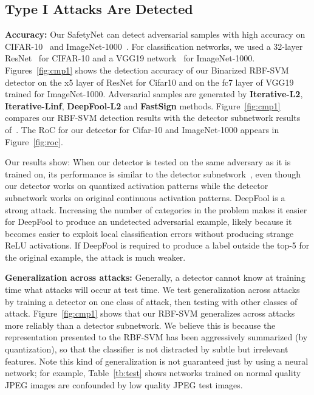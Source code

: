 \documentclass[10pt,twocolumn,letterpaper]{article}
\begin{document}
\subsection{Type I Attacks Are Detected}

{\bf Accuracy:} Our SafetyNet can detect adversarial samples with high accuracy on CIFAR-10~\cite{krizhevsky2009learning} and ImageNet-1000~\cite{deng2009imagenet}. 
For classification networks, we used a 32-layer ResNet~\cite{he2016deep} for CIFAR-10 and a VGG19 network~\cite{Simonyan14c} for ImageNet-1000.
Figures~\ref{fig:cmp1} shows the detection accuracy of our Binarized RBF-SVM detector on 
the x5 layer of ResNet for Cifar10 and on the fc7 layer of VGG19 trained for ImageNet-1000.
Adversarial samples are generated by \textbf{Iterative-L2}, \textbf{Iterative-Linf},
\textbf{DeepFool-L2} and \textbf{FastSign} methods.  Figure~\ref{fig:cmp1} compares 
our RBF-SVM detection results with the detector subnetwork results of~\cite{metzen2017detecting}. 
The RoC for our detector for Cifar-10 and ImageNet-1000 appears in Figure~\ref{fig:roc}. 

Our results show:  When our detector is tested on the same adversary as it is trained on, its performance is similar to
the detector subnetwork~\cite{metzen2017detecting}, even though our detector  works on quantized activation patterns while the detector subnetwork
works on original continuous activation patterns. DeepFool is a strong attack.  Increasing the number of categories in
the problem makes it easier for DeepFool to produce an undetected adversarial 
example, likely because it becomes easier to exploit local classification errors without producing strange ReLU
activations.  If DeepFool is required to produce a label outside the top-5 for the original example, the attack is much
weaker. 


{\bf Generalization across attacks:} 
Generally, a detector cannot know at training time what attacks will occur at test time.  We test generalization
across attacks by training a detector on one class of attack, then testing with other classes of attack. 
Figure~\ref{fig:cmp1} shows that our RBF-SVM generalizes across attacks more reliably than a detector subnetwork.
We believe this is because the representation presented
to the RBF-SVM has been aggressively summarized (by quantization), so that the classifier is not distracted by subtle
but irrelevant features. Note this kind of generalization is not guaranteed just by using a neural network; for example, Table~\ref{tb:test}
shows networks trained on normal quality JPEG images are confounded by low quality JPEG test images.
\end{document}
